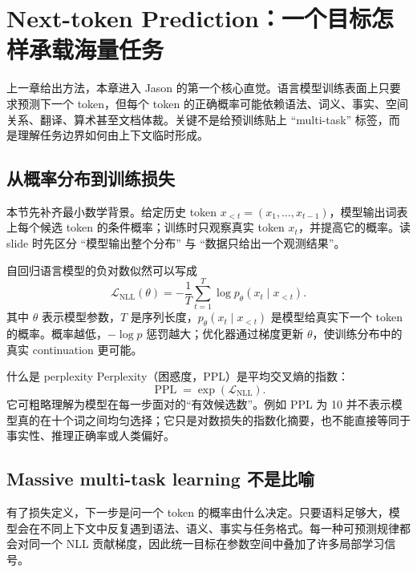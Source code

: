\section{Next-token Prediction：一个目标怎样承载海量任务}

上一章给出方法，本章进入 Jason 的第一个核心直觉。语言模型训练表面上只要求预测下一个 token，但每个 token 的正确概率可能依赖语法、词义、事实、空间关系、翻译、算术甚至文档体裁。关键不是给预训练贴上 ``multi-task'' 标签，而是理解任务边界如何由上下文临时形成。

\subsection{从概率分布到训练损失}

本节先补齐最小数学背景。给定历史 token $x_{<t}=(x_1,\ldots,x_{t-1})$，模型输出词表上每个候选 token 的条件概率；训练时只观察真实 token $x_t$，并提高它的概率。读 slide 时先区分 ``模型输出整个分布'' 与 ``数据只给出一个观测结果''。


自回归语言模型的负对数似然可以写成
\[
\mathcal{L}_{\mathrm{NLL}}(\theta)=-\frac{1}{T}\sum_{t=1}^{T}\log p_{\theta}(x_t\mid x_{<t}).
\]
其中 $\theta$ 表示模型参数，$T$ 是序列长度，$p_{\theta}(x_t\mid x_{<t})$ 是模型给真实下一个 token 的概率。概率越低，$-\log p$ 惩罚越大；优化器通过梯度更新 $\theta$，使训练分布中的真实 continuation 更可能。

\begin{knowledgebox}{什么是 perplexity}
Perplexity（困惑度，PPL）是平均交叉熵的指数：
\[
\operatorname{PPL}=\exp\!\left(\mathcal{L}_{\mathrm{NLL}}\right).
\]
它可粗略理解为模型在每一步面对的“有效候选数”。例如 PPL 为 10 并不表示模型真的在十个词之间均匀选择；它只是对数损失的指数化摘要，也不能直接等同于事实性、推理正确率或人类偏好。
\end{knowledgebox}

\subsection{Massive multi-task learning 不是比喻}

有了损失定义，下一步是问一个 token 的概率由什么决定。只要语料足够大，模型会在不同上下文中反复遇到语法、语义、事实与任务格式。每一种可预测规律都会对同一个 NLL 贡献梯度，因此统一目标在参数空间中叠加了许多局部学习信号。


